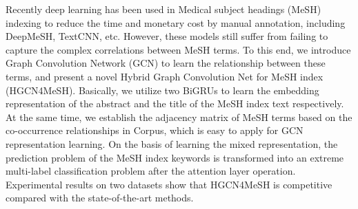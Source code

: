Recently deep learning has been used in Medical subject headings (MeSH) indexing to reduce the time and monetary cost by manual annotation, including DeepMeSH, TextCNN, etc. However, these models still suffer from failing to capture the complex correlations between MeSH terms. To this end, we introduce Graph Convolution Network (GCN) to learn the relationship between these terms, and present a novel Hybrid Graph Convolution Net for MeSH index (HGCN4MeSH). Basically, we utilize two BiGRUs to learn the embedding representation of the abstract and the title of the MeSH index text respectively. At the same time, we establish the adjacency matrix of MeSH terms based on the co-occurrence relationships in Corpus, which is easy to apply for GCN representation learning. On the basis of learning the mixed representation, the prediction problem of the MeSH index keywords is transformed into an extreme multi-label classification problem after the attention layer operation. Experimental results on two datasets show that HGCN4MeSH is competitive compared with the state-of-the-art methods.
